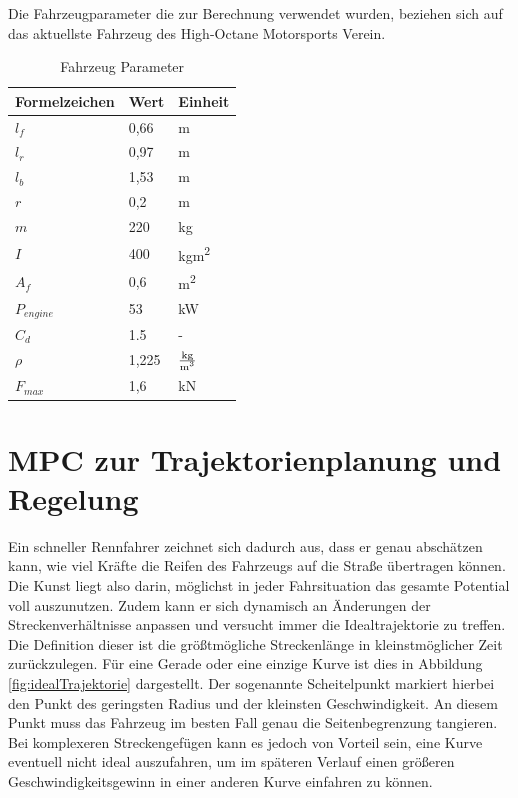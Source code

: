 \documentclass{like}
\begin{document}
Die Fahrzeugparameter die zur Berechnung verwendet wurden, beziehen sich auf das aktuellste Fahrzeug des High-Octane Motorsports Verein.


\begin{table}[]
	\centering
	\caption{Fahrzeug Parameter}
	\begin{tabular}{l|l|l}
		\hline
		Formelzeichen	& Wert & Einheit \\ \hline
		\(l_f\)	&	0,66 & m\\
		\(l_r\)	&	0,97 & m\\
		\(l_b\)	&	1,53 & m \\
		\(r\)	&	0,2 & m \\
		\(m\)	&  	220 & kg\\
		\(I\)	&  	400 & kgm\textsuperscript{2}\\
		\(A_f\)	&  	0,6 & m\textsuperscript{2}\\
		\(P_{engine}\) &  53 & kW\\
		\(C_d\)	&  	1.5 & - \\
		\(\rho\)	&  	1,225 & $\frac{\text{kg}}{\text{m\textsuperscript{3}}}$\\
		\(F_{max}\)	&  	1,6 & kN \\ 
	\end{tabular}
	\label{vehicleParam}
\end{table}






\chapter{MPC zur Trajektorienplanung und Regelung}

Ein schneller Rennfahrer zeichnet sich dadurch aus, dass er genau abschätzen kann, wie viel Kräfte die Reifen des Fahrzeugs auf die Straße übertragen können. Die Kunst liegt also darin, möglichst in jeder Fahrsituation das gesamte Potential voll auszunutzen. Zudem kann er sich dynamisch an Änderungen der Streckenverhältnisse anpassen und versucht immer die Idealtrajektorie zu treffen. Die Definition dieser ist die größtmögliche Streckenlänge in kleinstmöglicher Zeit zurückzulegen. Für eine Gerade oder eine einzige Kurve ist dies in Abbildung \ref{fig:idealTrajektorie} dargestellt. Der sogenannte Scheitelpunkt markiert hierbei den Punkt des geringsten Radius und der kleinsten Geschwindigkeit. An diesem Punkt muss das Fahrzeug im besten Fall genau die Seitenbegrenzung tangieren. 
Bei komplexeren Streckengefügen kann es jedoch von Vorteil sein, eine Kurve eventuell nicht ideal auszufahren, um im späteren Verlauf einen größeren Geschwindigkeitsgewinn in einer anderen Kurve einfahren zu können.
\end{document}
